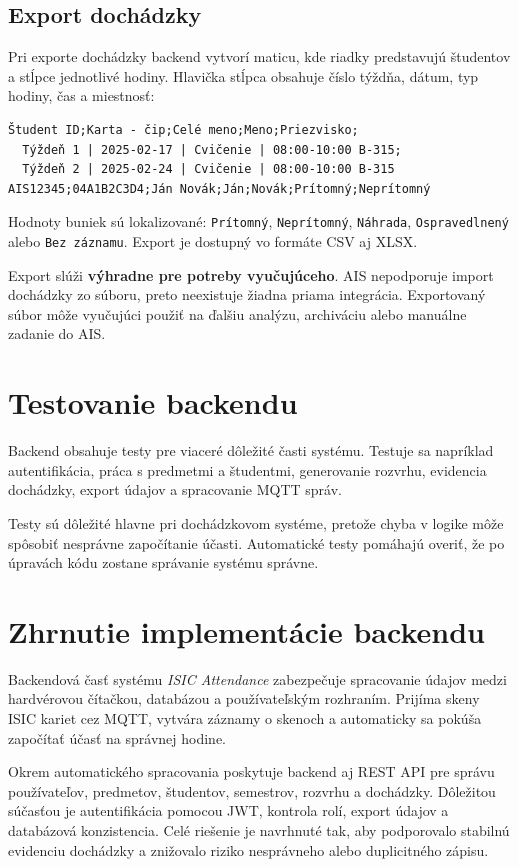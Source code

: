 \subsection*{Export dochádzky}

Pri exporte dochádzky backend vytvorí maticu, kde riadky predstavujú študentov a stĺpce jednotlivé hodiny. Hlavička stĺpca obsahuje číslo týždňa, dátum, typ hodiny, čas a miestnosť:

\begin{verbatim}
Študent ID;Karta - čip;Celé meno;Meno;Priezvisko;
  Týždeň 1 | 2025-02-17 | Cvičenie | 08:00-10:00 B-315;
  Týždeň 2 | 2025-02-24 | Cvičenie | 08:00-10:00 B-315
AIS12345;04A1B2C3D4;Ján Novák;Ján;Novák;Prítomný;Neprítomný
\end{verbatim}

Hodnoty buniek sú lokalizované: \texttt{Prítomný}, \texttt{Neprítomný}, \texttt{Náhrada}, \texttt{Ospravedlnený} alebo \texttt{Bez záznamu}. Export je dostupný vo formáte CSV aj XLSX.

Export slúži \textbf{výhradne pre potreby vyučujúceho}. AIS nepodporuje import dochádzky zo súboru, preto neexistuje žiadna priama integrácia. Exportovaný súbor môže vyučujúci použiť na ďalšiu analýzu, archiváciu alebo manuálne zadanie do AIS.

\section{Testovanie backendu}
\label{sec:backend-testing}

Backend obsahuje testy pre viaceré dôležité časti systému. Testuje sa napríklad autentifikácia, práca s predmetmi a študentmi, generovanie rozvrhu, evidencia dochádzky, export údajov a spracovanie MQTT správ.

Testy sú dôležité hlavne pri dochádzkovom systéme, pretože chyba v logike môže spôsobiť nesprávne započítanie účasti. Automatické testy pomáhajú overiť, že po úpravách kódu zostane správanie systému správne.

\section{Zhrnutie implementácie backendu}
\label{sec:backend-summary}

Backendová časť systému \textit{ISIC Attendance} zabezpečuje spracovanie údajov medzi hardvérovou čítačkou, databázou a používateľským rozhraním. Prijíma skeny ISIC kariet cez MQTT, vytvára záznamy o skenoch a automaticky sa pokúša započítať účasť na správnej hodine.

Okrem automatického spracovania poskytuje backend aj REST API pre správu používateľov, predmetov, študentov, semestrov, rozvrhu a dochádzky. Dôležitou súčasťou je autentifikácia pomocou JWT, kontrola rolí, export údajov a databázová konzistencia. Celé riešenie je navrhnuté tak, aby podporovalo stabilnú evidenciu dochádzky a znižovalo riziko nesprávneho alebo duplicitného zápisu.